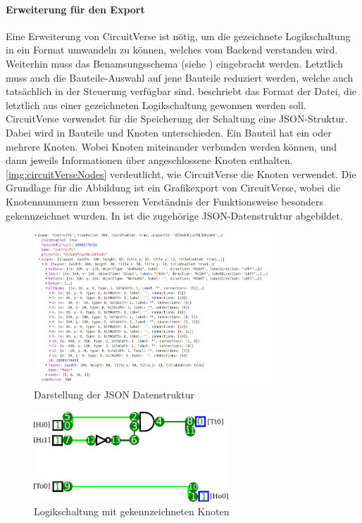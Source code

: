 \paragraph{Erweiterung für den Export}\label{par:erw}
 Eine Erweiterung von CircuitVerse ist nötig, um die gezeichnete Logikschaltung in ein Format umwandeln zu können, welches vom Backend verstanden wird. Weiterhin muss das Benamsungsschema (siehe ) eingebracht werden. Letztlich muss auch die Bauteile-Auswahl auf jene Bauteile reduziert werden, welche auch tatsächlich in der Steuerung verfügbar sind.  beschriebt das Format der Datei, die letztlich aus einer gezeichneten Logikschaltung gewonnen werden soll. CircuitVerse verwendet für die Speicherung der Schaltung eine JSON-Struktur. Dabei wird in Bauteile und Knoten unterschieden. Ein Bauteil hat ein oder mehrere Knoten. Wobei Knoten miteinander verbunden werden können, und dann jeweils Informationen über angeschlossene Knoten enthalten. \autoref{img:circuitVerseNodes} verdeutlicht, wie CircuitVerse die Knoten verwendet. Die Grundlage für die Abbildung ist ein Grafikexport von CircuitVerse, wobei die Knotennummern zum besseren Verständnis der Funktionsweise besonders gekennzeichnet wurden. In ist die zugehörige JSON-Datenstruktur abgebildet.
 \begin{figure}[H]
 	\begin{center}
 		\includegraphics[width=0.8\textwidth ,clip]{./images/circuitverseLogicJson.png}
 		\caption{Darstellung der JSON Datenstruktur}
 		\label{img:circuitVerseJson}
 	\end{center} 
 \end{figure}	
 
 \begin{figure}[H]
 	\begin{center}
 		\includegraphics[width=0.65\textwidth ,clip]{./images/circuitverseLogicNodes.pdf}
 		\caption{Logikschaltung mit gekennzeichneten Knoten}
 		\label{img:circuitVerseNodes}
 	\end{center} 
 \end{figure}	
 
